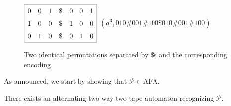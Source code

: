 \documentclass[runningheads, envcountsame, a4paper]{llncs}
\newcommand*{\perm}{\mathcal{P}}
\newcommand*{\colsep}{\#}
\newcommand*{\separator}{\$}
\newcommand*{\AFA}{\mathrm{AFA}}
\newcommand*{\some}{a}
\newcommand*{\amodel}{alternating two-way two-tape automaton\xspace}
\begin{document}
\begin{figure}[ht]
    \centering
$\def\arraystretch{1.5}
\begin{array}{|ccccccc|}
   \hline
   0 & 0 & 1 & \separator & 0 & 0 & 1 \\
   1 & 0 & 0 & \separator & 1 & 0 & 0 \\
   0 & 1 & 0 & \separator & 0 & 1 & 0 \\
   \hline
\end{array}$ \hspace{3em}
$(\some^3, 010\colsep 001 \colsep 100 \separator 010\colsep 001 \colsep 100)$
\caption{Two identical permutations separated by $\separator$s and the corresponding encoding}
    \label{identicalPermutations}
  \end{figure}%

As announced, we start by showing that $\perm \in \AFA$.

\begin{lemma}
  \label{PisinAFA}
There exists an \amodel recognizing $\perm$.
\end{lemma}
\end{document}
